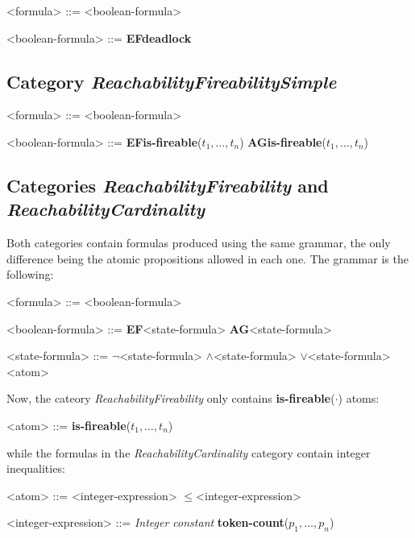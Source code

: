 \documentclass[10pt,english,a4paper]{article}
\newcommand\ctla             {\textbf{A}\xspace}
\newcommand\ctle             {\textbf{E}\xspace}
\newcommand\ltlf             {\textbf{F}\xspace}
\newcommand\ltlg             {\textbf{G}\xspace}
\newcommand\logicnot         {\boldmath$\lnot$\xspace}
\newcommand\logicand         {\boldmath$\land$\xspace}
\newcommand\logicor          {\boldmath$\lor$\xspace}
\newcommand\atomleq          {\boldmath$\leq$\xspace}
\newcommand\atomdead         {\textbf{deadlock}\xspace}
\newcommand\atomisfire[1]    {\textbf{is-fireable}(#1)}
\newcommand\atomtokenscnt[1] {\textbf{token-count}(#1)}
\begin{document}
\begin{grammar}

<formula> ::= <boolean-formula>

<boolean-formula> ::= \ctle \ltlf \atomdead

\end{grammar}

\subsection{Category \textit{ReachabilityFireabilitySimple}}

\begin{grammar}

<formula> ::= <boolean-formula> 

<boolean-formula> ::= \ctle \ltlf \atomisfire{$t_1, \ldots, t_n$}
\alt \ctla \ltlg \atomisfire{$t_1, \ldots, t_n$}

\end{grammar}

\subsection{Categories \textit{ReachabilityFireability} and \textit{ReachabilityCardinality}}

Both categories contain formulas produced using the same grammar, the only
difference being the atomic propositions allowed in each one.
The grammar is the following:

\begin{grammar}
<formula> ::= <boolean-formula>

<boolean-formula> ::= \ctle \ltlf <state-formula>
\alt \ctla \ltlg <state-formula>

<state-formula> ::=  \logicnot  <state-formula>
 \logicand <state-formula>
 \logicor  <state-formula>
\alt <atom>
\end{grammar}

Now, the cateory \emph{ReachabilityFireability} only contains
\atomisfire{$\cdot$} atoms:

\begin{grammar}
<atom> ::= \atomisfire{$t_1, \ldots, t_n$}
\end{grammar}

while the formulas in the \emph{ReachabilityCardinality} category contain
integer inequalities:

\begin{grammar}
<atom> ::= <integer-expression> \atomleq <integer-expression>

<integer-expression> ::= \textit{Integer constant}
\alt \atomtokenscnt{$p_1, \ldots, p_n$}
\end{grammar}
\end{document}
